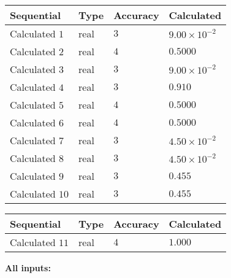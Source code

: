 \documentclass[12pt]{article}
\begin{document}
  
\noindent\begin{tabular}{|l|l|l|l|}
\hline
 Sequential & Type & Accuracy & Calculated \\ 
\hline
 
 
  Calculated $            1 $ & real & $            3  $ & 
 $ 9.00 \times 10^{-2} $ 
 \\  \hline  
 
 
  Calculated $            2 $ & real & $            4  $ & 
 $ 0.5000 $ 
 \\  \hline  
 
 
  Calculated $            3 $ & real & $            3  $ & 
 $ 9.00 \times 10^{-2} $ 
 \\  \hline  
 
 
  Calculated $            4 $ & real & $            3  $ & 
 $ 0.910 $ 
 \\  \hline  
 
 
  Calculated $            5 $ & real & $            4  $ & 
 $ 0.5000 $ 
 \\  \hline  
 
 
  Calculated $            6 $ & real & $            4  $ & 
 $ 0.5000 $ 
 \\  \hline  
 
 
  Calculated $            7 $ & real & $            3  $ & 
 $ 4.50 \times 10^{-2} $ 
 \\  \hline  
 
 
  Calculated $            8 $ & real & $            3  $ & 
 $ 4.50 \times 10^{-2} $ 
 \\  \hline  
 
 
  Calculated $            9 $ & real & $            3  $ & 
 $ 0.455 $ 
 \\  \hline  
 
 
  Calculated $           10 $ & real & $            3  $ & 
 $ 0.455 $ 
 \\  \hline  
 \end{tabular}
   
   
  
  
\noindent\begin{tabular}{|l|l|l|l|}
\hline
 Sequential & Type & Accuracy & Calculated \\ 
\hline
 
 
  Calculated $           11 $ & real & $            4  $ & 
 $ 1.000 $ 
 \\  \hline  
 \end{tabular}
   
   
   
   
\noindent\vspace{0.1in}\hspace{-0.08in} {\textbf{\Large{All inputs: }}}
   
\end{document}
